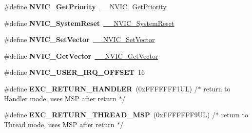 \begin{DoxyCompactItemize}
\#define {\bfseries N\+V\+I\+C\+\_\+\+Get\+Priority}~\mbox{\hyperlink{group___c_m_s_i_s___core___n_v_i_c_functions_gaeb9dc99c8e7700668813144261b0bc73}{\+\_\+\+\_\+\+N\+V\+I\+C\+\_\+\+Get\+Priority}}
\item 
\mbox{\label{group___c_m_s_i_s___core___n_v_i_c_functions_ga6aa0367d3642575610476bf0366f0c48}} 
\#define {\bfseries N\+V\+I\+C\+\_\+\+System\+Reset}~\mbox{\hyperlink{group___c_m_s_i_s___core___n_v_i_c_functions_ga0d9aa2d30fa54b41eb780c16e35b676c}{\+\_\+\+\_\+\+N\+V\+I\+C\+\_\+\+System\+Reset}}
\item 
\mbox{\label{group___c_m_s_i_s___core___n_v_i_c_functions_ga804af63bb4c4c317387897431814775d}} 
\#define {\bfseries N\+V\+I\+C\+\_\+\+Set\+Vector}~\mbox{\hyperlink{group___c_m_s_i_s___core___n_v_i_c_functions_ga0df355460bc1783d58f9d72ee4884208}{\+\_\+\+\_\+\+N\+V\+I\+C\+\_\+\+Set\+Vector}}
\item 
\mbox{\label{group___c_m_s_i_s___core___n_v_i_c_functions_ga955eb1c33a3dcc62af11a8385e8c0fc8}} 
\#define {\bfseries N\+V\+I\+C\+\_\+\+Get\+Vector}~\mbox{\hyperlink{group___c_m_s_i_s___core___n_v_i_c_functions_ga44b665d2afb708121d9b10c76ff00ee5}{\+\_\+\+\_\+\+N\+V\+I\+C\+\_\+\+Get\+Vector}}
\item 
\mbox{\label{group___c_m_s_i_s___core___n_v_i_c_functions_ga8045d905a5ca57437d8e6f71ffcb6df5}} 
\#define {\bfseries N\+V\+I\+C\+\_\+\+U\+S\+E\+R\+\_\+\+I\+R\+Q\+\_\+\+O\+F\+F\+S\+ET}~16
\item 
\mbox{\label{group___c_m_s_i_s___core___n_v_i_c_functions_gaa6fa2b10f756385433e08522d9e4632f}} 
\#define {\bfseries E\+X\+C\+\_\+\+R\+E\+T\+U\+R\+N\+\_\+\+H\+A\+N\+D\+L\+ER}~(0x\+F\+F\+F\+F\+F\+F\+F1\+U\+L)     /$\ast$ return to Handler mode, uses M\+S\+P after return                               $\ast$/
\item 
\mbox{\label{group___c_m_s_i_s___core___n_v_i_c_functions_gaea4703101b5e679f695e231f7ee72331}} 
\#define {\bfseries E\+X\+C\+\_\+\+R\+E\+T\+U\+R\+N\+\_\+\+T\+H\+R\+E\+A\+D\+\_\+\+M\+SP}~(0x\+F\+F\+F\+F\+F\+F\+F9\+U\+L)     /$\ast$ return to Thread mode, uses M\+S\+P after return                                $\ast$/

\end{DoxyCompactItemize}
